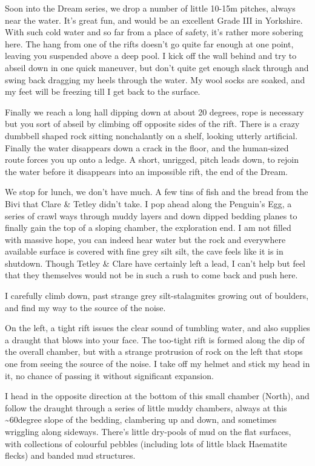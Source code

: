 Soon into the Dream series, we drop a number of little 10-15m pitches,
always near the water. It's great fun, and would be an excellent Grade
III in Yorkshire. With such cold water and so far from a place of
safety, it's rather more sobering here. The hang from one of the rifts
doesn't go quite far enough at one point, leaving you suspended above a
deep pool. I kick off the wall behind and try to abseil down in one
quick maneuver, but don't quite get enough slack through and swing back
dragging my heels through the water. My wool socks are soaked, and my
feet will be freezing till I get back to the surface.

Finally we reach a long hall dipping down at about 20 degrees, rope is
necessary but you sort of abseil by climbing off opposite sides of the
rift. There is a crazy dumbbell shaped rock sitting nonchalantly on a
shelf, looking utterly artificial. Finally the water disappears down a
crack in the floor, and the human-sized route forces you up onto a
ledge. A short, unrigged, pitch leads down, to rejoin the water before
it disappears into an impossible rift, the end of the Dream.

We stop for lunch, we don't have much. A few tins of fish and the bread
from the Bivi that Clare \& Tetley didn't take. I pop ahead along the
Penguin's Egg, a series of crawl ways through muddy layers and down
dipped bedding planes to finally gain the top of a sloping chamber, the
exploration end. I am not filled with massive hope, you can indeed hear
water but the rock and everywhere available surface is covered with fine
grey silt silt, the cave feels like it is in shutdown. Though Tetley \&
Clare have certainly left a lead, I can't help but feel that they
themselves would not be in such a rush to come back and push here.

I carefully climb down, past strange grey silt-stalagmites growing out
of boulders, and find my way to the source of the noise.

On the left, a tight rift issues the clear sound of tumbling water, and
also supplies a draught that blows into your face. The too-tight rift is
formed along the dip of the overall chamber, but with a strange
protrusion of rock on the left that stops one from seeing the source of
the noise. I take off my helmet and stick my head in it, no chance of
passing it without significant expansion.

I head in the opposite direction at the bottom of this small chamber
(North), and follow the draught through a series of little muddy
chambers, always at this \textasciitilde{}60degree slope of the bedding,
clambering up and down, and sometimes wriggling along sideways. There's
little dry-pools of mud on the flat surfaces, with collections of
colourful pebbles (including lots of little black Haematite flecks) and
banded mud structures.

